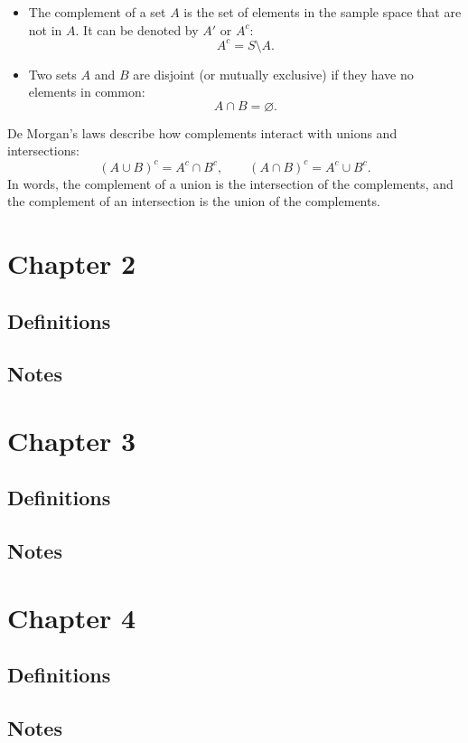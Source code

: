 \documentclass[12pt]{article}
\begin{document}
\begin{itemize}
\item The complement of a set $A$ is the set of elements in the sample space that are not in $A$. It can be denoted by $A'$ or $A^c$:
\[
A^c = S \setminus A.
\]
\item Two sets $A$ and $B$ are disjoint (or mutually exclusive) if they have no elements in common:
\[
A \cap B = \varnothing.
\]
\end{itemize}

De Morgan's laws describe how complements interact with unions and intersections:
\[
(A \cup B)^c = A^c \cap B^c,
\qquad
(A \cap B)^c = A^c \cup B^c.
\]
In words, the complement of a union is the intersection of the complements, and the
complement of an intersection is the union of the complements.

\section{Chapter 2}
\subsection{Definitions}
\subsection{Notes}

\section{Chapter 3}
\subsection{Definitions}
\subsection{Notes}

\section{Chapter 4}
\subsection{Definitions}
\subsection{Notes}
\end{document}
